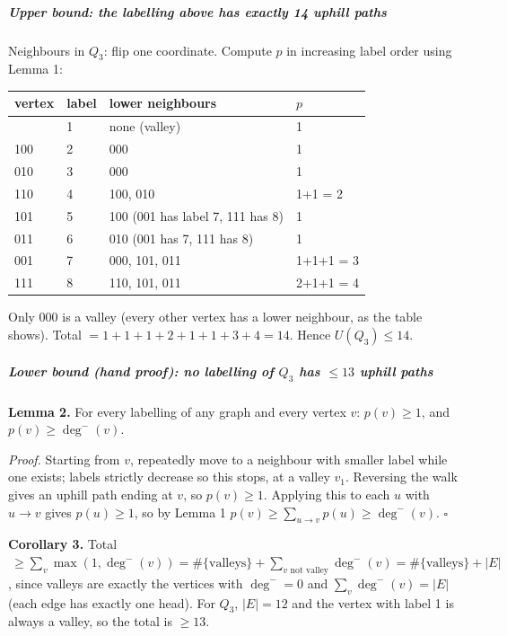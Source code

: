 \documentclass[11pt,a4paper]{article}
\begin{document}
\subparagraph{Upper bound: the labelling above has exactly 14 uphill
paths}\label{upper-bound-the-labelling-above-has-exactly-14-uphill-paths}

Neighbours in \(Q_3\): flip one coordinate. Compute \(p\) in increasing
label order using Lemma 1:

{\def\LTcaptype{none} %
\begin{longtable}[]{@{}llll@{}}
\toprule\noalign{}
vertex & label & lower neighbours & \(p\) \\
\midrule\noalign{}
\endhead
\bottomrule\noalign{}
\endlastfoot
000 & 1 & none (valley) & 1 \\
100 & 2 & 000 & 1 \\
010 & 3 & 000 & 1 \\
110 & 4 & 100, 010 & 1+1 = 2 \\
101 & 5 & 100 (001 has label 7, 111 has 8) & 1 \\
011 & 6 & 010 (001 has 7, 111 has 8) & 1 \\
001 & 7 & 000, 101, 011 & 1+1+1 = 3 \\
111 & 8 & 110, 101, 011 & 2+1+1 = 4 \\
\end{longtable}
}

Only 000 is a valley (every other vertex has a lower neighbour, as the
table shows). Total \(=1+1+1+2+1+1+3+4 = 14\). Hence \(U(Q_3)\le 14\).

\subparagraph{\texorpdfstring{Lower bound (hand proof): no labelling of
\(Q_3\) has \(\le 13\) uphill
paths}{Lower bound (hand proof): no labelling of Q\_3 has \textbackslash le 13 uphill paths}}\label{lower-bound-hand-proof-no-labelling-of-q_3-has-le-13-uphill-paths}

\textbf{Lemma 2.} For every labelling of any graph and every vertex
\(v\): \(p(v)\ge 1\), and \(p(v)\ge \deg^-(v)\).

\emph{Proof.} Starting from \(v\), repeatedly move to a neighbour with
smaller label while one exists; labels strictly decrease so this stops,
at a valley \(v_1\). Reversing the walk gives an uphill path ending at
\(v\), so \(p(v)\ge1\). Applying this to each \(u\) with \(u\to v\)
gives \(p(u)\ge1\), so by Lemma 1
\(p(v)\ge\sum_{u\to v}p(u)\ge\deg^-(v)\). \(\square\)

\textbf{Corollary 3.} Total
\(\ \ge \sum_v \max(1,\deg^-(v)) = \#\{\text{valleys}\} + \sum_{v \text{ not valley}}\deg^-(v) = \#\{\text{valleys}\} + |E|\),
since valleys are exactly the vertices with \(\deg^-=0\) and
\(\sum_v\deg^-(v)=|E|\) (each edge has exactly one head). For \(Q_3\),
\(|E|=12\) and the vertex with label 1 is always a valley, so the total
is \(\ge 13\).
\end{document}
